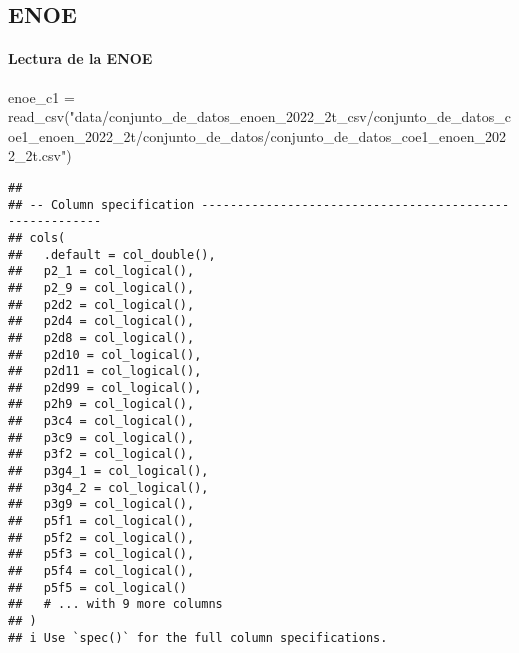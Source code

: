 \documentclass[
]{article}
\newenvironment{Shaded}{\begin{snugshade}}{\end{snugshade}}
\newcommand{\FunctionTok}[1]{\textcolor[rgb]{0.00,0.00,0.00}{#1}}
\newcommand{\NormalTok}[1]{#1}
\newcommand{\OtherTok}[1]{\textcolor[rgb]{0.56,0.35,0.01}{#1}}
\newcommand{\StringTok}[1]{\textcolor[rgb]{0.31,0.60,0.02}{#1}}
\begin{document}
\hypertarget{enoe}{%
\subsection{ENOE}\label{enoe}}

\hypertarget{lectura-de-la-enoe}{%
\paragraph{Lectura de la ENOE}\label{lectura-de-la-enoe}}

\begin{Shaded}
\begin{Highlighting}[]
\NormalTok{enoe\_c1 }\OtherTok{=} \FunctionTok{read\_csv}\NormalTok{(}\StringTok{"data/conjunto\_de\_datos\_enoen\_2022\_2t\_csv/conjunto\_de\_datos\_coe1\_enoen\_2022\_2t/conjunto\_de\_datos/conjunto\_de\_datos\_coe1\_enoen\_2022\_2t.csv"}\NormalTok{)}
\end{Highlighting}
\end{Shaded}

\begin{verbatim}
## 
## -- Column specification --------------------------------------------------------
## cols(
##   .default = col_double(),
##   p2_1 = col_logical(),
##   p2_9 = col_logical(),
##   p2d2 = col_logical(),
##   p2d4 = col_logical(),
##   p2d8 = col_logical(),
##   p2d10 = col_logical(),
##   p2d11 = col_logical(),
##   p2d99 = col_logical(),
##   p2h9 = col_logical(),
##   p3c4 = col_logical(),
##   p3c9 = col_logical(),
##   p3f2 = col_logical(),
##   p3g4_1 = col_logical(),
##   p3g4_2 = col_logical(),
##   p3g9 = col_logical(),
##   p5f1 = col_logical(),
##   p5f2 = col_logical(),
##   p5f3 = col_logical(),
##   p5f4 = col_logical(),
##   p5f5 = col_logical()
##   # ... with 9 more columns
## )
## i Use `spec()` for the full column specifications.
\end{verbatim}
\end{document}
